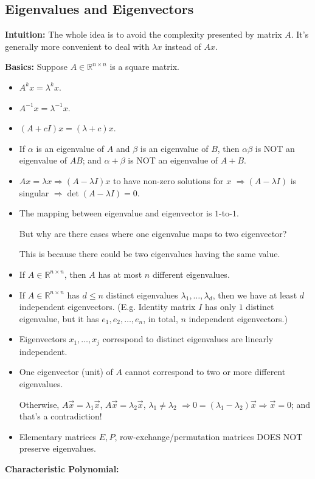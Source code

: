 \documentclass[14pt]{article}
\theoremstyle{definition}
\theoremstyle{remark}
\begin{document}
\begin{multicols}{2}
    \section{Eigenvalues and Eigenvectors}
    \textbf{Intuition:} The whole idea is to avoid the complexity presented by matrix $A$. It's generally more convenient to deal with $\lambda x$ instead of $Ax$.

    \textbf{Basics:} Suppose $A \in \mathbb{R}^{n\times n}$ is a square matrix.
    \begin{itemize}
        \item $A^k x = \lambda^k x$.
        \item $A^{-1}x = \lambda^{-1} x$.
        \item $(A+cI)x = (\lambda+c)x$.
        \item If $\alpha$ is an eigenvalue of $A$ and $\beta$ is an eigenvalue of $B$, then $\alpha\beta$ is NOT an eigenvalue of $AB$; and $\alpha + \beta$ is NOT an eigenvalue of $A + B$.
        \item $Ax=\lambda x \Longrightarrow (A-\lambda I)x$ to have non-zero solutions for $x$ $\Longrightarrow  (A-\lambda I)$ is singular $\Longrightarrow \det(A-\lambda I) = 0$.
        \item The mapping between eigenvalue and eigenvector is $1$-to-$1$.

              But why are there cases where one eigenvalue maps to two eigenvector?

              This is because there could be two eigenvalues having the same value.
        \item If $A \in \mathbb{R}^{n\times n}$, then $A$ has at most $n$ different eigenvalues.
        \item If $A\in \mathbb{R}^{n\times n}$ has $d\le n$ distinct eigenvalues $\lambda_1, \ldots, \lambda_d$, then we have at least $d$ independent eigenvectors. (E.g. Identity matrix $I$ has only $1$ distinct eigenvalue, but it has $e_1, e_2, \ldots, e_n$, in total, $n$ independent eigenvectors.)
        \item Eigenvectors $x_1, \ldots,x_j$ correspond to distinct eigenvalues are linearly independent.
        \item One eigenvector (unit) of $A$ cannot correspond to two or more different eigenvalues.

              Otherwise, $A \vec{x}=\lambda_1 \vec{x}$, $A \vec{x}=\lambda_2 \vec{x}$, $\lambda_1 \neq \lambda_2$
              $\Rightarrow 0=\left(\lambda_1-\lambda_2\right) \vec{x} \Rightarrow \vec{x}=0$; and that's a contradiction!
        \item Elementary matrices $E, P$, row-exchange/permutation matrices DOES NOT preserve eigenvalues.
    \end{itemize}
    \textbf{Characteristic Polynomial:}


\end{multicols}
\end{document}
